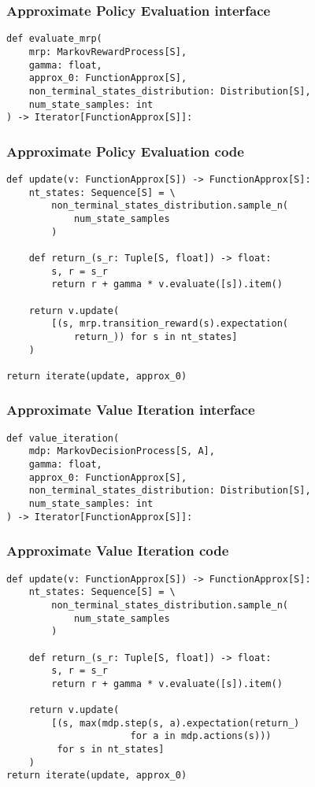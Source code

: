 \documentclass[handout]{beamer}
\begin{document}
\begin{frame}[fragile]
\frametitle{Approximate Policy Evaluation interface}
\pause
\begin{lstlisting}
def evaluate_mrp(
    mrp: MarkovRewardProcess[S],
    gamma: float,
    approx_0: FunctionApprox[S],
    non_terminal_states_distribution: Distribution[S],
    num_state_samples: int
) -> Iterator[FunctionApprox[S]]:
\end{lstlisting}
\end{frame}

\begin{frame}[fragile]
\frametitle{Approximate Policy Evaluation code}
\pause
\begin{lstlisting}
def update(v: FunctionApprox[S]) -> FunctionApprox[S]:
    nt_states: Sequence[S] = \
        non_terminal_states_distribution.sample_n(
            num_state_samples
        )

    def return_(s_r: Tuple[S, float]) -> float:
        s, r = s_r
        return r + gamma * v.evaluate([s]).item()

    return v.update(
        [(s, mrp.transition_reward(s).expectation(
            return_)) for s in nt_states]
    )

return iterate(update, approx_0)
\end{lstlisting}
\end{frame}

\begin{frame}[fragile]
\frametitle{Approximate Value Iteration interface}
\pause
\begin{lstlisting}
def value_iteration(
    mdp: MarkovDecisionProcess[S, A],
    gamma: float,
    approx_0: FunctionApprox[S],
    non_terminal_states_distribution: Distribution[S],
    num_state_samples: int
) -> Iterator[FunctionApprox[S]]:
\end{lstlisting}
\end{frame}

\begin{frame}[fragile]
\frametitle{Approximate Value Iteration code}
\pause
\begin{lstlisting}
def update(v: FunctionApprox[S]) -> FunctionApprox[S]:
    nt_states: Sequence[S] = \
        non_terminal_states_distribution.sample_n(
            num_state_samples
        )

    def return_(s_r: Tuple[S, float]) -> float:
        s, r = s_r
        return r + gamma * v.evaluate([s]).item()

    return v.update(
        [(s, max(mdp.step(s, a).expectation(return_)
                      for a in mdp.actions(s)))
         for s in nt_states]
    )
return iterate(update, approx_0)
\end{lstlisting}
\end{frame}
\end{document}
